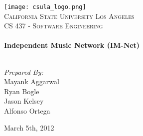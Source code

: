 \begin{titlepage}
\begin{center}


\texttt{[image: csula\_logo.png]}\\[1cm]    

\textsc{\LARGE California State University Los Angeles}\\[1.5cm]

\textsc{\Large CS 437 - Software Engineering}\\[0.5cm]


\HRule \\[0.4cm]
{ \huge \bfseries \textcolor{title}{Independent Music Network (IM-Net)}}\\[0.4cm]

\HRule \\[1.5cm]

\begin{minipage}{0.4\textwidth}
\begin{center} \large
\emph{Prepared By:}\\
Mayank Aggarwal\\
Ryan Bogle\\
Jason Kelsey\\
Alfonso Ortega
\end{center}
\end{minipage}

\vfill

{\large March 5th, 2012}

\end{center}
\end{titlepage}
